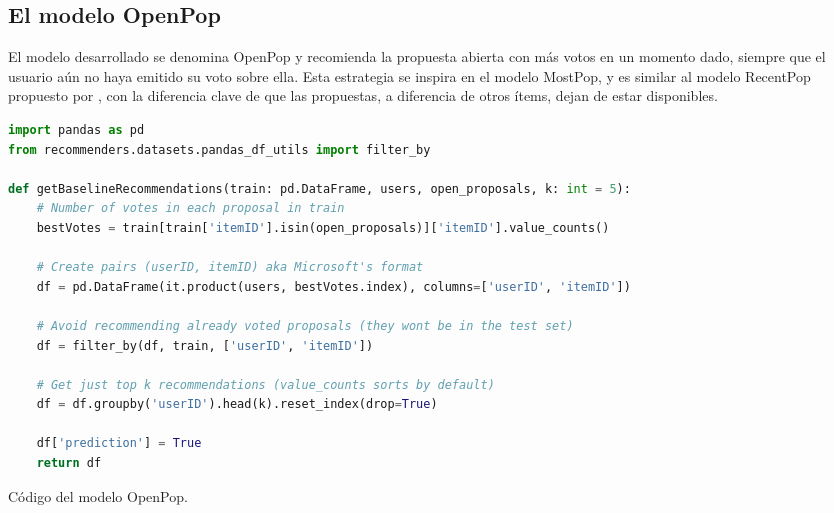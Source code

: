 
\subsection{El modelo OpenPop}
\label{subsec:openpop}

El modelo desarrollado se denomina OpenPop y recomienda la propuesta abierta con más votos en un momento dado, siempre que el usuario aún no haya emitido su voto sobre ella. Esta estrategia se inspira en el modelo MostPop, y es similar al modelo RecentPop propuesto por \textcite{ji_re-visit_2020}, con la diferencia clave de que las propuestas, a diferencia de otros ítems, dejan de estar disponibles.

\begin{code}
\begin{lstlisting}[language=Python]
import pandas as pd
from recommenders.datasets.pandas_df_utils import filter_by

def getBaselineRecommendations(train: pd.DataFrame, users, open_proposals, k: int = 5):
    # Number of votes in each proposal in train
    bestVotes = train[train['itemID'].isin(open_proposals)]['itemID'].value_counts()

    # Create pairs (userID, itemID) aka Microsoft's format
    df = pd.DataFrame(it.product(users, bestVotes.index), columns=['userID', 'itemID'])

    # Avoid recommending already voted proposals (they wont be in the test set)
    df = filter_by(df, train, ['userID', 'itemID'])

    # Get just top k recommendations (value_counts sorts by default)
    df = df.groupby('userID').head(k).reset_index(drop=True)

    df['prediction'] = True
    return df
\end{lstlisting}
\caption[Código del modelo OpenPop.]{Código del modelo OpenPop.}
\label{cod:openpop}
\end{code}

